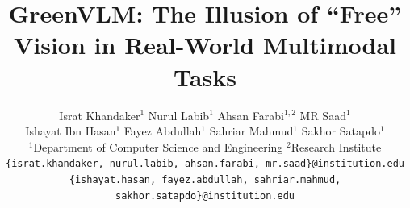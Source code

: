 \documentclass[10pt,twocolumn,letterpaper]{article}
\title{GreenVLM: The Illusion of ``Free'' Vision in Real-World Multimodal Tasks}
\author{
Israt Khandaker$^{1}$ \quad
Nurul Labib$^{1}$ \quad
Ahsan Farabi$^{1,2}$ \quad
MR Saad$^{1}$ \\
Ishayat Ibn Hasan$^{1}$ \quad
Fayez Abdullah$^{1}$ \quad
Sahriar Mahmud$^{1}$ \quad
Sakhor Satapdo$^{1}$ \\[2mm]
$^{1}$Department of Computer Science and Engineering \quad $^{2}$Research Institute \\
{\tt\small \{israt.khandaker, nurul.labib, ahsan.farabi, mr.saad\}@institution.edu} \\
{\tt\small \{ishayat.hasan, fayez.abdullah, sahriar.mahmud, sakhor.satapdo\}@institution.edu}
}
\begin{document}
\maketitle

    






{
    \small
    
    
}

% 
\end{document}
